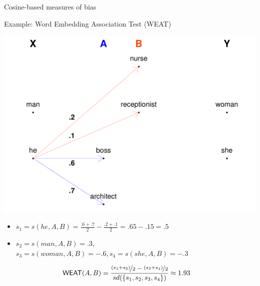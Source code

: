 \documentclass[
  10pt,
  ignorenonframetext,
  x11names, dvipsnames, bibspacing,natbib, table]{beamer}
\begin{document}
\begin{frame}{Cosine-based measures of bias}
\protect\hypertarget{cosine-based-measures-of-bias-2}{}
\begin{block}{Example: Word Embedding Association Test (WEAT)}
\protect\hypertarget{example-word-embedding-association-test-weat}{}
\vspace{1mm}
\footnotesize

\begin{center}\includegraphics[width=0.55\linewidth]{presentationBoston_files/figure-beamer/unnamed-chunk-2-1} \end{center}
\normalsize

\pause

\footnotesize

\begin{itemize}
\item
  \(s_1 = s(he,A,B) = \frac{.6+.7}{2} - \frac{.2+.1}{2} = .65-.15= .5\)
\item
  \(s_2 = s(man,A,B) = .3\),
  \linebreak  \(s_3 = s(woman,A,B) = -.6, s_4 = s(she, A, B) = -.3\)
\end{itemize}

\vspace{-4mm}

\normalsize

\begin{align*}
\mathsf{WEAT}(A,B) & = \frac{\nicefrac{(s_1+s_2)}{2} - \nicefrac{(s_3+s_4)}{2}}{sd(\{s_1,s_2,s_3,s_4\})} \approx 1.93
\end{align*}
\end{block}
\end{frame}
\end{document}
